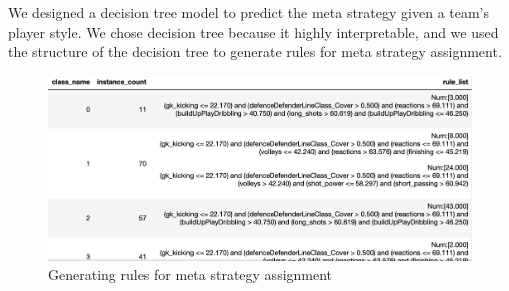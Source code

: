\documentclass{article}
\begin{document}
We designed a decision tree model to predict the meta strategy given a team's player style. We chose decision tree because it highly interpretable, and we used the structure of the decision tree to generate rules for meta strategy assignment.

\begin{figure}[H]
\centering
\includegraphics[width=.8\textwidth]{dc.png}
\caption{Generating rules for meta strategy assignment}
\label{fig:dc}
\end{figure}
\end{document}
